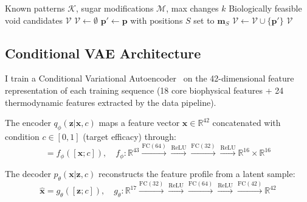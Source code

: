 \documentclass{article}
\begin{document}
\begin{algorithm}[t]
\caption{Void Candidate Enumeration with Biological Filtering}
\label{alg:void}
\begin{algorithmic}[1]
\Require Known patterns $\mathcal{K}$, sugar modifications $\mathcal{M}$, max changes $k$
\Ensure Biologically feasible void candidates $\mathcal{V}$
\State $\mathcal{V} \leftarrow \emptyset$
      \State $\mathbf{p}' \leftarrow \mathbf{p}$ with positions $S$ set to $\mathbf{m}_S$
        \State $\mathcal{V} \leftarrow \mathcal{V} \cup \{\mathbf{p}'\}$
      \EndIf
    \EndFor
  \EndFor
\EndFor
\State \Return $\mathcal{V}$
\end{algorithmic}
\end{algorithm}

\subsection{Conditional VAE Architecture}

I train a Conditional Variational Autoencoder~\citep{kingma2014} on the 42-dimensional feature representation of each training sequence (18 core biophysical features + 24 thermodynamic features extracted by the data pipeline).

The encoder $q_\phi(\mathbf{z} | \mathbf{x}, c)$ maps a feature vector $\mathbf{x} \in \mathbb{R}^{42}$ concatenated with condition $c \in [0,1]$ (target efficacy) through:
\begin{equation}
  [\boldsymbol{\mu}, \log \boldsymbol{\sigma}^2] = f_\phi([\mathbf{x}; c]), \quad
  f_\phi: \mathbb{R}^{43} \xrightarrow{\text{FC}(64)} \xrightarrow{\text{ReLU}} \xrightarrow{\text{FC}(32)} \xrightarrow{\text{ReLU}} \mathbb{R}^{16} \times \mathbb{R}^{16}
\end{equation}

The decoder $p_\theta(\mathbf{x} | \mathbf{z}, c)$ reconstructs the feature profile from a latent sample:
\begin{equation}
  \hat{\mathbf{x}} = g_\theta([\mathbf{z}; c]), \quad
  g_\theta: \mathbb{R}^{17} \xrightarrow{\text{FC}(32)} \xrightarrow{\text{ReLU}} \xrightarrow{\text{FC}(64)} \xrightarrow{\text{ReLU}} \xrightarrow{\text{FC}(42)} \mathbb{R}^{42}
\end{equation}
\end{document}
